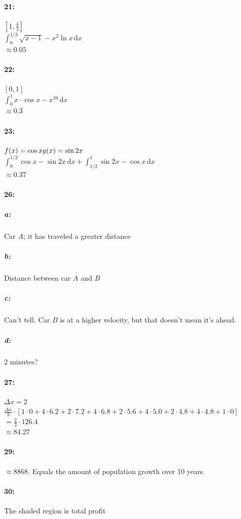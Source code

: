 \documentclass[12pt]{article}
\newcommand{\dx}{\mathrm{d}x}
\begin{document}
    \paragraph*{21:\\}
    $[1, \frac{4}{3}]$\\
    $\int_{0}^{1/3} \! \sqrt{x-1} - x^2 \ln x \, \dx$\\
    $\approx 0.05$\\
    \paragraph*{22:\\}
    $[0, 1]$\\
    $\int_{0}^{1} \! x\cdot\cos{x} - x^{10} \, \dx$\\
    $\approx 0.3$\\
    \paragraph{23:\\}
    $f(x) = \cos{x}\\g(x) = \sin{2x}$\\
    $\int_{0}^{1/2} \! \cos{x} - \sin{2x} \, \dx + \int_{1/2}^{1} \! \sin{2x} - \cos{x} \, \dx$\\
    $\approx 0.37$
    \paragraph*{26:\\}
    \subparagraph*{a:}
    Car $A$; it has traveled a greater distance
    \subparagraph*{b:}
    Distance between car $A$ and $B$
    \subparagraph*{c:}
    Can't tell. Car $B$ is at a higher velocity, but that doesn't mean it's ahead.
    \subparagraph*{d:}
    2 minutes?
    \paragraph*{27:\\}
    $\Delta x = 2$\\
    $\frac{\Delta x}{3} \cdot [1\cdot0 + 4\cdot6.2 + 2\cdot7.2 + 4\cdot6.8 + 2\cdot5.6 + 4\cdot5.0 + 2\cdot4.8 + 4\cdot4.8 + 1\cdot0]$
    $= \frac{2}{3} \cdot 126.4$\\
    $\approx 84.27$
    \paragraph*{29:\\}
    $\approx 8868$. Equals the amount of population growth over 10 years.
    \paragraph*{30:\\}
    The shaded region is total profit

\thispagestyle{fancy}
\end{document}
